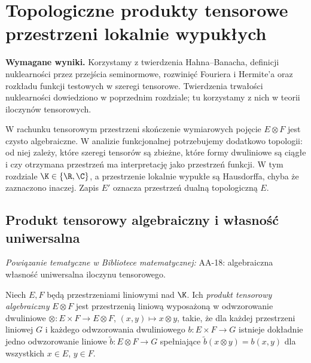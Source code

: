 \setcounter{section}{23}
\section{Topologiczne produkty tensorowe przestrzeni lokalnie wypukłych}
\label{sec:tensor24}

\providecommand{\atlasref}[2]{#2}


\noindent\textbf{Wymagane wyniki.} Korzystamy z twierdzenia
Hahna--Banacha, definicji nuklearności przez przejścia seminormowe,
rozwinięć Fouriera i Hermite'a oraz rozkładu funkcji testowych
w szeregi tensorowe. Twierdzenia trwałości nuklearności
dowiedziono w poprzednim rozdziale; tu korzystamy z nich
w teorii iloczynów tensorowych.
\medskip

W rachunku tensorowym przestrzeni skończenie wymiarowych pojęcie
$E\otimes F$ jest czysto algebraiczne. W analizie funkcjonalnej
potrzebujemy dodatkowo topologii: od niej zależy, które szeregi
tensorów są zbieżne, które formy dwuliniowe są ciągłe i czy
otrzymana przestrzeń ma interpretację jako przestrzeń funkcji.
W tym rozdziale $\K\in\{\R,\C\}$, a przestrzenie lokalnie wypukłe
są Hausdorffa, chyba że zaznaczono inaczej. Zapis $E'$ oznacza
przestrzeń dualną topologiczną $E$.

\subsection{Produkt tensorowy algebraiczny i własność uniwersalna}

\noindent\emph{Powiązanie tematyczne w Bibliotece matematycznej:} \atlasref{AA-18::aa:tw:tensor-universal}{AA-18: algebraiczna własność uniwersalna iloczynu tensorowego}.


\begin{definicja}
\label{def:alg-tensor24}
Niech $E,F$ będą przestrzeniami liniowymi nad $\K$.
Ich \emph{produkt tensorowy algebraiczny} $E\otimes F$ jest
przestrzenią liniową wyposażoną w odwzorowanie dwuliniowe
$\otimes:E\times F\to E\otimes F$, $ (x,y)\mapsto x\otimes y$,
takie, że dla każdej przestrzeni liniowej $G$ i każdego
odwzorowania dwuliniowego $b:E\times F\to G$ istnieje dokładnie
jedno odwzorowanie liniowe $\widetilde b:E\otimes F\to G$
spełniające $\widetilde b(x\otimes y)=b(x,y)$ dla wszystkich
$x\in E$, $y\in F$.
\end{definicja}

